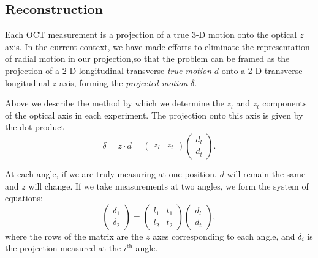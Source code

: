 \documentclass[aip,cp,amsmath,amssymb,reprint]{revtex4-2}
\begin{document}
\subsection{\label{sec:reconstruction}Reconstruction}
\par{Each OCT measurement is a projection of a true 3-D motion onto the optical $z$ axis. In the current context, we have made efforts to eliminate the representation of radial motion in our projection,so that the problem can be framed as the projection of a 2-D longitudinal-transverse \textit{true motion} $d$ onto a 2-D transverse-longitudinal $z$ axis, forming the \textit{projected motion} $\delta$.}
\par{Above we describe the method by which we determine the $z_l$ and $z_t$ components of the optical axis in each experiment. The projection onto this axis is given by the dot product
     \begin{equation}
         \delta = z \cdot d = \begin{pmatrix}z_l& z_t\end{pmatrix}\begin{pmatrix}d_l\\d_t\end{pmatrix}.
     \end{equation}
}
\par{At each angle, if we are truly measuring at one position, $d$ will remain the same and $z$ will     change. If we take measurements at two angles, we form the system of equations:
     \begin{equation}\label{projmat}
         \begin{pmatrix}\delta_1 \\ \delta_2\end{pmatrix} = \begin{pmatrix}l_1 & t_1\\l_2 & t_2\end{pmatrix}\begin{pmatrix}d_l\\d_t\end{pmatrix},
     \end{equation}
     where the rows of the matrix are the $z$ axes corresponding to each angle, and $\delta_i$ is the     projection measured at the $i^\text{th}$ angle.
}
\end{document}

